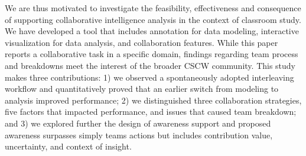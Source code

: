 We are thus motivated to investigate the feasibility, effectiveness and
consequence of supporting collaborative intelligence analysis in the context of
classroom study. We have developed a tool that includes annotation for data
modeling, interactive visualization for data analysis, and collaboration
features. While this paper reports a collaborative task in a specific
domain, findings regarding team process and breakdowns
meet the interest of the broader CSCW community. This study makes three
contributions: 1) we observed a spontaneously adopted interleaving workflow and
quantitatively proved that an earlier switch from modeling to analysis improved
performance; 2) we distinguished three collaboration strategies, five factors
that impacted performance, and issues that caused team breakdown; and 3) we
explored further the design of awareness support and proposed awareness
surpasses simply teams actions but includes contribution value, uncertainty, and
context of insight.
